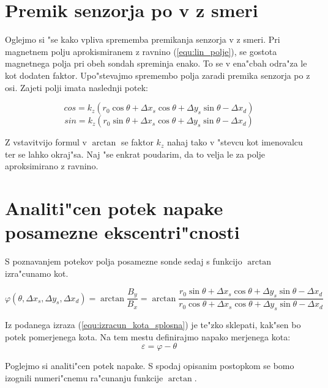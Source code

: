 \section{Premik senzorja po  v z smeri}

Oglejmo si "se kako vpliva sprememba premikanja senzorja v z smeri.
Pri magnetnem polju aprokismiranem z ravnino (\ref{equ:lin_polje}), se gostota magnetnega polja pri obeh sondah spreminja enako. To se v ena"cbah odra"za le kot dodaten faktor. Upo"stevajmo spremembo polja zaradi premika senzorja po z osi. Zajeti polji imata naslednji potek:


\begin{equation}\label{equ:Bx_z}
cos=k_z( r_0 \cos\theta +\Delta x_s \cos\theta +\Delta y_s \sin\theta -\Delta x_d)
\end{equation}
\begin{equation}\label{equ:By_z}
sin=k_z( r_0 \sin\theta +\Delta x_s \cos\theta +\Delta y_s \sin\theta-\Delta x_d)
\end{equation}

Z vstavitvijo formul v $\arctan$ se faktor $k_z$ nahaj tako v "stevcu kot imenovalcu ter se lahko okraj"sa. Naj "se  enkrat poudarim, da to velja le za polje aproksimirano z ravnino.






\section{Analiti"cen potek napake posamezne ekscentri"cnosti}

S poznavanjem potekov polja posamezne sonde sedaj s funkcijo $\arctan$ izra"cunamo kot.

\begin{equation}
\label{equ:izracun_kota_splosna}
\varphi(\theta,\Delta x_s, \Delta y_s, \Delta x_d)=\arctan\frac{B_y}{B_x}=\arctan\frac{r_0 \sin\theta +\Delta x_s \cos\theta +\Delta y_s \sin\theta-\Delta x_d}{r_0 \cos\theta +\Delta x_s \cos\theta +\Delta y_s \sin\theta -\Delta x_d}
\end{equation}




Iz podanega izraza (\ref{equ:izracun_kota_splosna}) je te"zko sklepati, kak"sen bo potek pomerjenega kota.
Na tem mestu definirajmo napako merjenega kota:
\begin{equation}
\varepsilon=\varphi-\theta
\end{equation}

Poglejmo si analiti"cen potek napake.  S spodaj opisanim postopkom se bomo izognili numeri"cnemu ra"cunanju funkcije $\arctan$.

